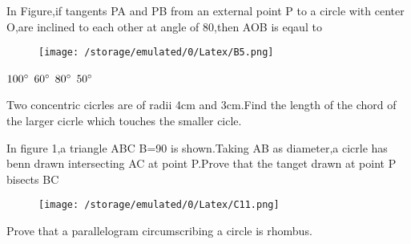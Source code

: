 \documentclass[12pt]{exam}
\author{saikiran}
\begin{document}
\begin{questions}

\question 
In Figure,if tangents PA and PB from an external point P to a circle with center O,are inclined to each other at angle of 80\degree,then \angle AOB is eqaul to
\begin{figure}[H]
\centering
\texttt{[image: /storage/emulated/0/Latex/B5.png]}
\caption{}
\end{figure}
\begin{choices}
\choice $100\degree$
\choice $60\degree$
\choice $80\degree$
\choice $50\degree$
\end{choices}

\question 
Two concentric cicrles are of radii 4cm and 3cm.Find the length of the chord of the larger cicrle which touches the smaller cicle.

\question
In figure 1,a triangle ABC \angle B=90 \degree is shown.Taking AB as diameter,a cicrle has benn drawn intersecting AC at point P.Prove that  the tanget drawn at point P bisects BC
\begin{figure}[H]
\centering
\texttt{[image: /storage/emulated/0/Latex/C11.png]}
\end{figure}
\question 
Prove that a parallelogram circumscribing a circle is rhombus.

\question 
{}


\end{questions}
\end{document}
